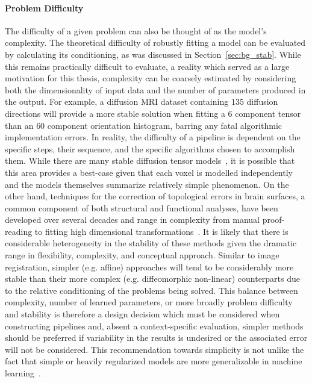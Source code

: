 \paragraph*{Problem Difficulty}
The difficulty of a given problem can also be thought of as the model's complexity. The theoretical difficulty of
robustly fitting a model can be evaluated by calculating its conditioning, as was discussed in
Section~\ref{sec:bg_stab}. While this remains practically difficult to evaluate, a reality which served as a large
motivation for this thesis, complexity can be coarsely estimated by considering both the dimensionality of input
data and the number of parameters produced in the output. For example, a diffusion MRI dataset containing $135$
diffusion directions will provide a more stable solution when fitting a $6$ component tensor than an $60$ component
orientation histogram, barring any fatal algorithmic implementation errors. In reality, the difficulty of a
pipeline is dependent on the specific steps, their sequence, and the specific algorithms chosen to accomplish them.
While there are many stable diffusion tensor models~\cite{skare2000condition}, it is possible that this area
provides a best-case given that each voxel is modelled independently and the models themselves summarize relatively
simple phenomenon. On the other hand, techniques for the correction of topological errors in brain surfaces, a
common component of both structural and functional analyses, have been developed over several decades and range in
complexity from manual proof-reading to fitting high dimensional transformations~\cite{yotter2011topological}. It
is likely that there is considerable heterogeneity in the stability of these methods given the dramatic range in
flexibility, complexity, and conceptual approach. Similar to image registration, simpler (e.g. affine) approaches
will tend to be considerably more stable than their more complex (e.g. diffeomorphic non-linear) counterparts due
to the relative conditioning of the problems being solved. This balance between complexity, number of learned
parameters, or more broadly problem difficulty and stability is therefore a design decision which must be considered
when constructing pipelines and, absent a context-specific evaluation, simpler methods should be preferred if
variability in the results is undesired or the associated error will not be considered. This recommendation towards
simplicity is not unlike the fact that simple or heavily regularized models are more generalizable in machine
learning~\cite{lever2016regularization}.


